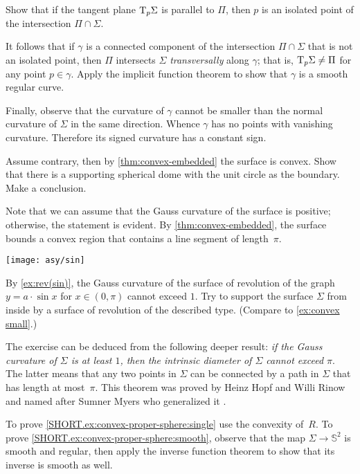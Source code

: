 \begin{multicols}{2}
Show that if the tangent plane $\mathrm{T}_p\Sigma$ is parallel to $\Pi$,
then $p$ is an isolated point of the intersection $\Pi\cap\Sigma$.

It follows that if $\gamma$ is a connected component of the intersection $\Pi\cap\Sigma$ that is not an isolated point,
then $\Pi$ intersects $\Sigma$ \emph{transversally} along $\gamma$;
that is, $\mathrm{T}_p\Sigma\ne\Pi$ for any point $p \in \gamma$.
Apply the implicit function theorem to show that $\gamma$ is a smooth regular curve.

Finally, observe that the curvature of $\gamma$ cannot be smaller than the normal curvature of $\Sigma$ in the same direction.
Whence $\gamma$ has no points with vanishing curvature.
Therefore its signed curvature has a constant sign.


Assume contrary, then by \ref{thm:convex-embedded} the surface is convex.
Show that there is a supporting spherical dome with the unit circle as the boundary.
Make a conclusion.

Note that we can assume that the Gauss curvature of the surface is positive; otherwise, the statement is evident.
By \ref{thm:convex-embedded}, the surface bounds a convex region that contains a line segment of length~$\pi$.

\begin{Figure}
\vskip-0mm
\centering
\texttt{[image: asy/sin]}
\vskip-0mm
\end{Figure}

By \ref{ex:rev(sin)}, the Gauss curvature of the surface of revolution of the graph $y=a\cdot \sin x$ for $x\in(0,\pi)$ cannot exceed $1$.
Try to support the surface $\Sigma$ from inside by a surface of revolution of the described type.
(Compare to \ref{ex:convex small}.)

The exercise can be deduced from the following deeper result: \textit{if the Gauss curvature of $\Sigma$ is at least $1$,
then
the intrinsic diameter of $\Sigma$ cannot exceed $\pi$}.
The latter means that any two points in $\Sigma$ can be connected by a path in $\Sigma$ that has length at most~$\pi$.
This theorem was proved by Heinz Hopf and Willi Rinow \cite{hopf-rinow} and 
named after Sumner Myers who generalized it \cite{myers}.


To prove \ref{SHORT.ex:convex-proper-sphere:single} use the convexity of~$R$.
To prove \ref{SHORT.ex:convex-proper-sphere:smooth}, observe that the map $\Sigma\to\mathbb{S}^2$ is smooth and regular, then apply the inverse function theorem to show that its inverse is smooth as well.


\end{multicols}
